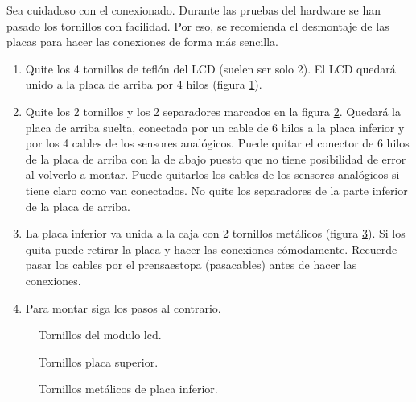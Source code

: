 \begin{tcolorbox}
[colback=red!5!white,colframe=red!75!black,fonttitle=\bfseries,title=Desmontaje ]
Sea cuidadoso con el conexionado. Durante las pruebas del hardware se han pasado los tornillos con facilidad. Por eso, se recomienda el desmontaje de las placas para hacer las conexiones de forma más sencilla.
\begin{enumerate}
\item Quite los 4 tornillos de teflón del LCD (suelen ser solo 2). El LCD quedará unido a la placa de arriba por 4 hilos (figura \ref{desmontaje:1}).
\item Quite los 2 tornillos y los 2 separadores marcados en la figura \ref{desmontaje:2}. Quedará la placa de arriba suelta, conectada por un cable de 6 hilos a la placa inferior y por los 4 cables de los sensores analógicos. Puede quitar el conector de 6 hilos de la placa de arriba con la de abajo puesto que no tiene posibilidad de error al volverlo a montar. Puede quitarlos los cables de los sensores analógicos si tiene claro como van conectados. No quite los separadores de la parte inferior de la placa de arriba.
\item La placa inferior va unida a la caja con 2 tornillos metálicos (figura \ref{desmontaje:3}). Si los quita puede retirar la placa y hacer las conexiones cómodamente. Recuerde pasar los cables por el prensaestopa (pasacables) antes de hacer las conexiones. 
\item Para montar siga los pasos al contrario.
\end{enumerate}
\end{tcolorbox}

\begin{figure}[htbp!]
\caption{Tornillos del modulo lcd.}\label{desmontaje:1}
\end{figure}

\begin{figure}[htbp!]
\caption{Tornillos placa superior.}\label{desmontaje:2}
\end{figure}

\begin{figure}[htbp!]
\caption{Tornillos metálicos de placa inferior.}\label{desmontaje:3}
\end{figure}


